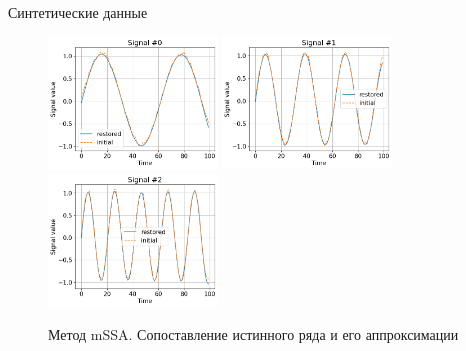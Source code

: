 \begin{frame}{Синтетические данные}
{			\begin{figure}
				\includegraphics[width=0.4\textwidth, keepaspectratio]{img/mssa_sines_compar.png}
				\includegraphics[width=0.4\textwidth, keepaspectratio]{img/mssa_sines_compar1.png}
				\includegraphics[width=0.4\textwidth, keepaspectratio]{img/mssa_sines_compar2.png}
				\caption{Метод mSSA. Сопоставление истинного ряда и его аппроксимации}
			\end{figure}
			
		}
		
	\end{frame}
	
